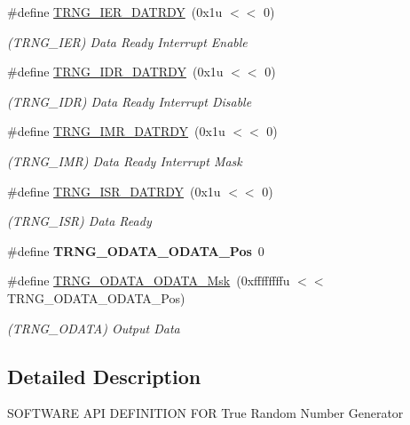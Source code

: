 \begin{DoxyCompactItemize}
\mbox{\label{group__SAMS70__TRNG_gafa7553fafb1e7444a80b7e47618ac7c6}} 
\#define \mbox{\hyperlink{group__SAMS70__TRNG_gafa7553fafb1e7444a80b7e47618ac7c6}{T\+R\+N\+G\+\_\+\+I\+E\+R\+\_\+\+D\+A\+T\+R\+DY}}~(0x1u $<$$<$ 0)
\begin{DoxyCompactList}\small\item\em (T\+R\+N\+G\+\_\+\+I\+ER) Data Ready Interrupt Enable \end{DoxyCompactList}\item 
\mbox{\label{group__SAMS70__TRNG_ga2eca36f87c24da433fc1023980bdec96}} 
\#define \mbox{\hyperlink{group__SAMS70__TRNG_ga2eca36f87c24da433fc1023980bdec96}{T\+R\+N\+G\+\_\+\+I\+D\+R\+\_\+\+D\+A\+T\+R\+DY}}~(0x1u $<$$<$ 0)
\begin{DoxyCompactList}\small\item\em (T\+R\+N\+G\+\_\+\+I\+DR) Data Ready Interrupt Disable \end{DoxyCompactList}\item 
\mbox{\label{group__SAMS70__TRNG_ga85fa478ab4fd7c5abe0424fea333de82}} 
\#define \mbox{\hyperlink{group__SAMS70__TRNG_ga85fa478ab4fd7c5abe0424fea333de82}{T\+R\+N\+G\+\_\+\+I\+M\+R\+\_\+\+D\+A\+T\+R\+DY}}~(0x1u $<$$<$ 0)
\begin{DoxyCompactList}\small\item\em (T\+R\+N\+G\+\_\+\+I\+MR) Data Ready Interrupt Mask \end{DoxyCompactList}\item 
\mbox{\label{group__SAMS70__TRNG_ga1a78d13cc2eeeb76c61f130f75410de9}} 
\#define \mbox{\hyperlink{group__SAMS70__TRNG_ga1a78d13cc2eeeb76c61f130f75410de9}{T\+R\+N\+G\+\_\+\+I\+S\+R\+\_\+\+D\+A\+T\+R\+DY}}~(0x1u $<$$<$ 0)
\begin{DoxyCompactList}\small\item\em (T\+R\+N\+G\+\_\+\+I\+SR) Data Ready \end{DoxyCompactList}\item 
\mbox{\label{group__SAMS70__TRNG_gac9f3e26a110e4b2ce4a94dd6cff44e6f}} 
\#define {\bfseries T\+R\+N\+G\+\_\+\+O\+D\+A\+T\+A\+\_\+\+O\+D\+A\+T\+A\+\_\+\+Pos}~0
\item 
\mbox{\label{group__SAMS70__TRNG_ga29f339c544af097a0d2552bda327d4a5}} 
\#define \mbox{\hyperlink{group__SAMS70__TRNG_ga29f339c544af097a0d2552bda327d4a5}{T\+R\+N\+G\+\_\+\+O\+D\+A\+T\+A\+\_\+\+O\+D\+A\+T\+A\+\_\+\+Msk}}~(0xffffffffu $<$$<$ T\+R\+N\+G\+\_\+\+O\+D\+A\+T\+A\+\_\+\+O\+D\+A\+T\+A\+\_\+\+Pos)
\begin{DoxyCompactList}\small\item\em (T\+R\+N\+G\+\_\+\+O\+D\+A\+TA) Output Data \end{DoxyCompactList}\end{DoxyCompactItemize}


\subsection{Detailed Description}
S\+O\+F\+T\+W\+A\+RE A\+PI D\+E\+F\+I\+N\+I\+T\+I\+ON F\+OR True Random Number Generator 